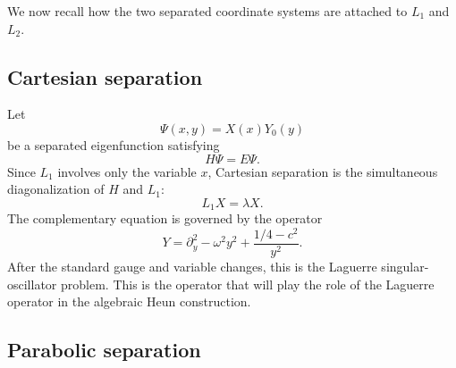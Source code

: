 \documentclass[11pt]{article}
\numberwithin{equation}{section}
\theoremstyle{definition}
\theoremstyle{remark}
\begin{document}
We now recall how the two separated coordinate systems are attached to
\(L_1\) and \(L_2\).

\subsection{Cartesian separation}

Let
\[
        \Psi(x,y)=X(x)Y_0(y)
\]
be a separated eigenfunction satisfying
\[
        H\Psi=E\Psi.
\]
Since \(L_1\) involves only the variable \(x\), Cartesian separation is the
simultaneous diagonalization of \(H\) and \(L_1\):
\begin{equation}
        L_1X=\lambda X.
\end{equation}
The complementary equation is governed by the operator
\begin{equation}
        Y=\partial_y^2-\omega^2y^2+\frac{1/4-c^2}{y^2}.
        \label{eq:Ydef}
\end{equation}
After the standard gauge and variable changes,
this is the Laguerre singular-oscillator problem.  This is the operator that
will play the role of the Laguerre operator in the algebraic Heun
construction.

\subsection{Parabolic separation}
\end{document}
